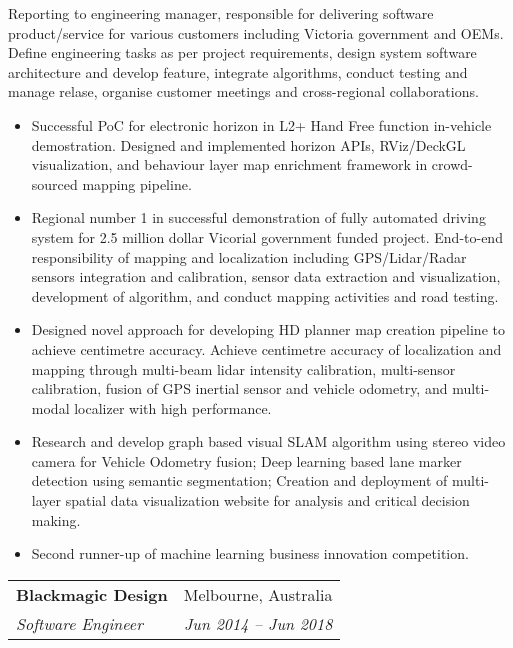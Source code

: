 \documentclass[letterpaper,11pt]{article}
\makeatletter
\newcommand{\resumeItemNoBullet}[4]{
  \vspace{-1pt}
    \begin{tabular*}{0.97\textwidth}{l@{\extracolsep{\fill}}r}
      \textbf{#1} & #2 \\
      \textit{\small#3} & \textit{\small #4} \\
    \end{tabular*}\vspace{-7pt}
}
\newcommand{\resumeSubHeadingListStart}{\begin{itemize}[leftmargin=*]}
\newcommand{\resumeSubHeadingListEnd}{\end{itemize}}
\makeatother
\begin{document}
\vspace{10pt}
{Reporting to engineering manager, responsible for delivering software product/service for various customers including Victoria government and OEMs. Define engineering tasks as per project requirements, design system software architecture and develop feature, integrate algorithms, conduct testing and manage relase, organise customer meetings and cross-regional collaborations. }
  \resumeSubHeadingListStart
    \item Successful PoC for electronic horizon in L2+ Hand Free function in-vehicle demostration. Designed and implemented horizon APIs, RViz/DeckGL visualization, and behaviour layer map enrichment framework in crowd-sourced mapping pipeline.
    \item Regional number 1 in successful demonstration of fully automated driving system for 2.5 million dollar Vicorial government funded project. End-to-end responsibility of mapping and localization including GPS/Lidar/Radar sensors integration and calibration, sensor data extraction and visualization, development of algorithm, and conduct mapping activities and road testing.
    \item Designed novel approach for developing HD planner map creation pipeline to achieve centimetre accuracy. Achieve centimetre accuracy of localization and mapping through multi-beam lidar intensity calibration, multi-sensor calibration, fusion of GPS inertial sensor and vehicle odometry, and multi-modal localizer with high performance.
    \item Research and develop graph based visual SLAM algorithm using stereo video camera for Vehicle Odometry fusion; Deep learning based lane marker detection using semantic segmentation; Creation and deployment of multi-layer spatial data visualization website for analysis and critical decision making.
    \item Second runner-up of machine learning business innovation competition. 
  \resumeSubHeadingListEnd

\resumeItemNoBullet
{Blackmagic Design}{Melbourne, Australia}
{Software Engineer}{Jun 2014 -- Jun 2018}
\end{document}
